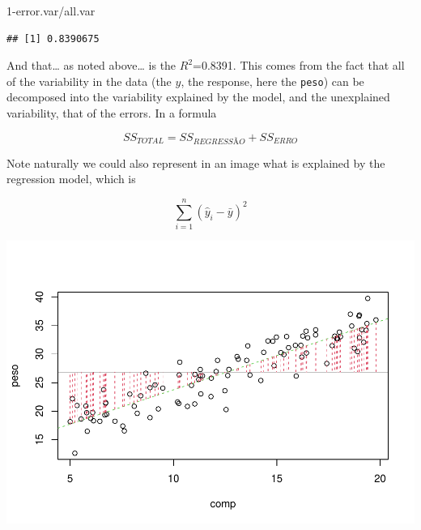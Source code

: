 \documentclass[
]{book}
\newenvironment{Shaded}{\begin{snugshade}}{\end{snugshade}}
\newcommand{\AttributeTok}[1]{\textcolor[rgb]{0.77,0.63,0.00}{#1}}
\newcommand{\CommentTok}[1]{\textcolor[rgb]{0.56,0.35,0.01}{\textit{#1}}}
\newcommand{\DecValTok}[1]{\textcolor[rgb]{0.00,0.00,0.81}{#1}}
\newcommand{\FunctionTok}[1]{\textcolor[rgb]{0.00,0.00,0.00}{#1}}
\newcommand{\NormalTok}[1]{#1}
\newcommand{\SpecialCharTok}[1]{\textcolor[rgb]{0.00,0.00,0.00}{#1}}
\begin{document}
\begin{Shaded}
\begin{Highlighting}[]
\DecValTok{1}\SpecialCharTok{{-}}\NormalTok{error.var}\SpecialCharTok{/}\NormalTok{all.var}
\end{Highlighting}
\end{Shaded}

\begin{verbatim}
## [1] 0.8390675
\end{verbatim}

And that\ldots{} as noted above\ldots{} is the \(R^2\)=0.8391. This comes from the fact that all of the variability in the data (the \(y\), the response, here the \texttt{peso}) can be decomposed into the variability explained by the model, and the unexplained variability, that of the errors. In a formula

\[SS_{TOTAL}=SS_{REGRESSÃO}+SS_{ERRO}\]

Note naturally we could also represent in an image what is explained by the regression model, which is

\[\sum_{i=1}^n (\hat y_i- \bar y)^2\]

\begin{Shaded}
\end{Shaded}

\includegraphics{ECOMODbook_files/figure-latex/a6.18-1.pdf}
\end{document}
